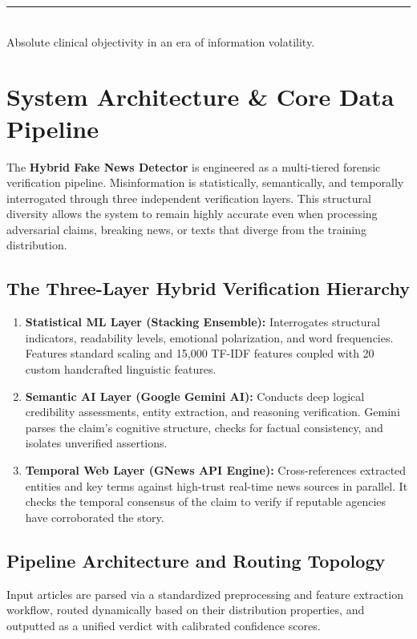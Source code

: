 \documentclass[11pt,a4paper,oneside]{article}
\begin{document}
\begin{titlepage}
    \vspace{1.5cm}
    \textcolor{secondary}{\rule{0.6\textwidth}{1.2pt}}\\[0.2cm]
    {\small Absolute clinical objectivity in an era of information volatility.}
\end{titlepage}

\newpage
\section{System Architecture \& Core Data Pipeline}
\label{sec:architecture}

The \textbf{Hybrid Fake News Detector} is engineered as a multi-tiered forensic verification pipeline. Misinformation is statistically, semantically, and temporally interrogated through three independent verification layers. This structural diversity allows the system to remain highly accurate even when processing adversarial claims, breaking news, or texts that diverge from the training distribution.

\subsection{The Three-Layer Hybrid Verification Hierarchy}
\begin{enumerate}
    \item \textbf{Statistical ML Layer (Stacking Ensemble):} Interrogates structural indicators, readability levels, emotional polarization, and word frequencies. Features standard scaling and 15,000 TF-IDF features coupled with 20 custom handcrafted linguistic features.
    \item \textbf{Semantic AI Layer (Google Gemini AI):} Conducts deep logical credibility assessments, entity extraction, and reasoning verification. Gemini parses the claim’s cognitive structure, checks for factual consistency, and isolates unverified assertions.
    \item \textbf{Temporal Web Layer (GNews API Engine):} Cross-references extracted entities and key terms against high-trust real-time news sources in parallel. It checks the temporal consensus of the claim to verify if reputable agencies have corroborated the story.
\end{enumerate}

\subsection{Pipeline Architecture and Routing Topology}
Input articles are parsed via a standardized preprocessing and feature extraction workflow, routed dynamically based on their distribution properties, and outputted as a unified verdict with calibrated confidence scores.
\end{document}
